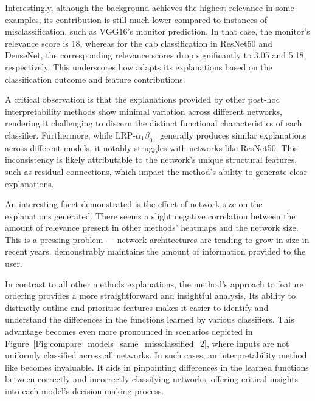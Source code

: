 Interestingly, although the background achieves the highest relevance in some examples, its contribution is still much lower compared to instances of misclassification, such as VGG16's monitor prediction. In that case, the monitor's relevance score is 18, whereas for the cab classification in ResNet50 and DenseNet, the corresponding relevance scores drop significantly to 3.05 and 5.18, respectively. This underscores how \CTC\/ adapts its explanations based on the classification outcome and feature contributions.

A critical observation is that the explanations provided by other post-hoc interpretability methods show minimal variation across different networks, rendering it challenging to discern the distinct functional characteristics of each classifier. Furthermore, while LRP-$\alpha_1\beta_0$~\cite{bach2015pixel} generally produces similar explanations across different models, it notably struggles with networks like ResNet50. This inconsistency is likely attributable to the network’s unique structural features, such as residual connections, which impact the method's ability to generate clear explanations.

An interesting facet demonstrated is the effect of network size on the explanations generated. There seems a slight negative correlation between the amount of relevance present in other methods' heatmaps and the network size. This is a pressing problem --- network architectures are tending to grow in size in recent years. \CTC\/ demonstrably maintains the amount of information provided to the user.

In contrast to all other methods explanations, the \CTC\/ method's approach to feature ordering provides a more straightforward and insightful analysis. Its ability to distinctly outline and prioritise features makes it easier to identify and understand the differences in the functions learned by various classifiers. This advantage becomes even more pronounced in scenarios depicted in Figure~\ref{Fig:compare_models_same_missclassified_2}, where inputs are not uniformly classified across all networks. In such cases, an interpretability method like \CTC\/ becomes invaluable. It aids in pinpointing differences in the learned functions between correctly and incorrectly classifying networks, offering critical insights into each model's decision-making process.

